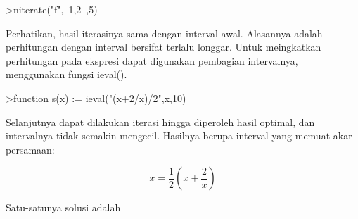 \documentclass[12pt,arial,letterpaper]{book}
\begin{document}
\begin{eulernootebook}
\begin{eulercomment}
\begin{eulercomment}
\begin{eulernootebook}
\begin{eulercomment}
\begin{eulercomment}
\begin{eulercomment}
\begin{eulercomment}
\begin{eulercomment}
\begin{eulercomment}
\begin{eulernotebook}
\begin{eulercomment}
\begin{eulercomment}
\begin{eulercomment}
\begin{eulercomment}
\begin{eulercomment}
\begin{eulercomment}
\begin{eulercomment}
\begin{eulercomment}
\begin{eulercomment}
\begin{eulercomment}
\begin{eulercomment}
\begin{eulercomment}
\begin{eulercomment}
\begin{eulercomment}
\begin{eulercomment}
\begin{eulercomment}
\begin{eulercomment}
\begin{eulercomment}
\begin{eulercomment}
\begin{eulercomment}
\begin{eulercomment}
\begin{eulercomment}
\begin{eulercomment}
\begin{eulercomment}
\begin{eulercomment}
\begin{eulercomment}
\begin{eulercomment}
\begin{eulercomment}
\begin{eulercomment}
\begin{eulercomment}
\begin{eulerprompt}
>niterate("f",~1,2~,5)
\end{eulerprompt}
\begin{euleroutput}
  [ ~1,2~,  ~1,2~,  ~1,2~,  ~1,2~,  ~1,2~,  ~1,2~ ]
\end{euleroutput}
\begin{eulercomment}
Perhatikan, hasil iterasinya sama dengan interval awal. Alasannya
adalah perhitungan dengan interval bersifat terlalu longgar. Untuk
meingkatkan perhitungan pada ekspresi dapat digunakan pembagian
intervalnya, menggunakan fungsi ieval().
\end{eulercomment}
\begin{eulerprompt}
>function s(x) := ieval("(x+2/x)/2",x,10)
\end{eulerprompt}
\begin{eulercomment}
Selanjutnya dapat dilakukan iterasi hingga diperoleh hasil optimal,
dan intervalnya tidak semakin mengecil. Hasilnya berupa interval yang
memuat akar persamaan:

\end{eulercomment}
\begin{eulerformula}
\[
x = \frac{1}{2} \left( x + \frac{2}{x} \right)
\]
\end{eulerformula}
\begin{eulercomment}
Satu-satunya solusi adalah


\end{eulercomment}
\end{eulercomment}
\end{eulercomment}
\end{eulercomment}
\end{eulercomment}
\end{eulercomment}
\end{eulercomment}
\end{eulercomment}
\end{eulercomment}
\end{eulercomment}
\end{eulercomment}
\end{eulercomment}
\end{eulercomment}
\end{eulercomment}
\end{eulercomment}
\end{eulercomment}
\end{eulercomment}
\end{eulercomment}
\end{eulercomment}
\end{eulercomment}
\end{eulercomment}
\end{eulercomment}
\end{eulercomment}
\end{eulercomment}
\end{eulercomment}
\end{eulercomment}
\end{eulercomment}
\end{eulercomment}
\end{eulercomment}
\end{eulercomment}
\end{eulercomment}
\end{eulernotebook}
\end{eulercomment}
\end{eulercomment}
\end{eulercomment}
\end{eulercomment}
\end{eulercomment}
\end{eulercomment}
\end{eulernootebook}
\end{eulercomment}
\end{eulercomment}
\end{eulernootebook}
\end{document}
